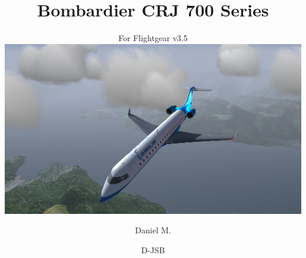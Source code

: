 \subject{Flightgear Documentation}
\title{Bombardier CRJ 700 Series}
\subtitle{For Flightgear v3.5\\
\vspace{5mm}
\includegraphics[width=\textwidth]{./pictures/titleshot.png}
}
\author{Daniel M. \and D-JSB}
